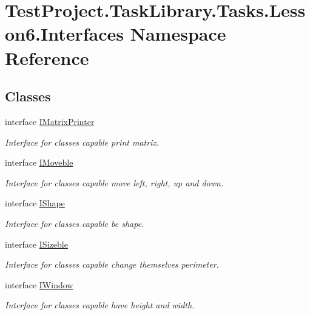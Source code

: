 \hypertarget{namespace_test_project_1_1_task_library_1_1_tasks_1_1_lesson6_1_1_interfaces}{}\section{Test\+Project.\+Task\+Library.\+Tasks.\+Lesson6.\+Interfaces Namespace Reference}
\label{namespace_test_project_1_1_task_library_1_1_tasks_1_1_lesson6_1_1_interfaces}
\subsection*{Classes}
\begin{DoxyCompactItemize}
\item 
interface \mbox{\hyperlink{interface_test_project_1_1_task_library_1_1_tasks_1_1_lesson6_1_1_interfaces_1_1_i_matrix_printer}{I\+Matrix\+Printer}}
\begin{DoxyCompactList}\small\item\em Interface for classes capable print matrix. \end{DoxyCompactList}\item 
interface \mbox{\hyperlink{interface_test_project_1_1_task_library_1_1_tasks_1_1_lesson6_1_1_interfaces_1_1_i_moveble}{I\+Moveble}}
\begin{DoxyCompactList}\small\item\em Interface for classes capable move left, right, up and down. \end{DoxyCompactList}\item 
interface \mbox{\hyperlink{interface_test_project_1_1_task_library_1_1_tasks_1_1_lesson6_1_1_interfaces_1_1_i_shape}{I\+Shape}}
\begin{DoxyCompactList}\small\item\em Interface for classes capable be shape. \end{DoxyCompactList}\item 
interface \mbox{\hyperlink{interface_test_project_1_1_task_library_1_1_tasks_1_1_lesson6_1_1_interfaces_1_1_i_sizeble}{I\+Sizeble}}
\begin{DoxyCompactList}\small\item\em Interface for classes capable change themselves perimeter. \end{DoxyCompactList}\item 
interface \mbox{\hyperlink{interface_test_project_1_1_task_library_1_1_tasks_1_1_lesson6_1_1_interfaces_1_1_i_window}{I\+Window}}
\begin{DoxyCompactList}\small\item\em Interface for classes capable have height and width. \end{DoxyCompactList}\end{DoxyCompactItemize}

